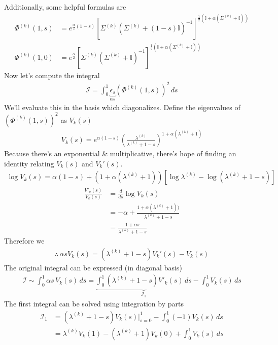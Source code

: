 \documentclass[12pt,fleqn]{article}
\numberwithin{equation}{section}
\begin{document}
Additionally, some helpful formulas are
\begin{align}
	\Phi^{(k)}(1,s) & = e^{\frac{\alpha}{2}(1-s)} \left[ \Sigma^{(k)}   (\Sigma^{(k)} + (1-s) \mathbb I)^{-1}\right]^{\frac{1}{2}(\mathbb I + \alpha (\Sigma^{(k)} + \mathbb I))} \\
	\Phi^{(k)}(1,0) & = e^{\frac{\alpha}{2}} \left[ \Sigma^{(k)}   (\Sigma^{(k)} +  \mathbb I)^{-1}\right]^{\frac{1}{2}(\mathbb I + \alpha (\Sigma^{(k)} + \mathbb I))}
\end{align}
Now let's compute the integral
\begin{align}
	\mathcal I =\int_0^1 \underbrace{\epsilon_s}_{\alpha s} \left(\Phi^{(k)}(1,s) \right)^2 \,ds
\end{align}
We'll evaluate this in the basis which diagonalizes. Define the eigenvalues of $\left(\Phi^{(k)}(1,s) \right)^2$ as $V_k(s)$
\begin{align}
	V_k(s) = e^{\alpha (1-s)} \left( \frac{\lambda^{(k)}}{\lambda^{(k)} + 1 - s} \right)^{1 + \alpha (\lambda^{(k)} +1)}
\end{align}
Because there's an exponential \& multiplicative, there's hope of finding an identity relating $V_k(s)$ and $V_k'(s)$. 
\begin{align}
	\log V_k(s) = \alpha(1-s) + (1 + \alpha(\lambda^{(k)} + 1) ) \left[\log \lambda^{(k)}  - \log (\lambda^{(k)} + 1 - s) \right]
\end{align}
\begin{align}
	\frac{V'_k(s)}{V_k(s)} & = \frac{d}{ds} \log V_k(s) \\
	& = - \alpha  + \frac{1 + \alpha (\lambda^{(k)} + 1))}{\lambda^{(k)} + 1 - s}\\
	& = \frac{1 + \alpha s}{\lambda^{(k)} + 1 - s}
\end{align}
Therefore we 
\begin{align}
	\therefore \, \alpha s V_k(s) = (\lambda^{(k)} + 1 -s)V_k'(s) - V_k(s) 
\end{align}
The original integral can be expressed (in diagonal basis)
\begin{align}
	\mathcal I \sim \int_0^1 \alpha s \, V_k(s)\,ds = \underbrace{\int_0^1 (\lambda^{(k)}  + 1 - s) V'_k(s) \, ds}_{\mathcal I_1}  - \int_0^1 V_k(s) \, ds
\end{align}
The first integral can be solved using integration by parts
\begin{align}
	\mathcal I_1 & = (\lambda^{(k)}  + 1 -s) V_k(s) \Big|_{s=0}^1 - \int_0^1 (-1) V_k(s)\,ds\\
	& = \lambda^{(k)}  V_k(1) - (\lambda^{(k)}  + 1) V_k(0) + \int_0^1 V_k(s) \, ds
\end{align}
\end{document}
